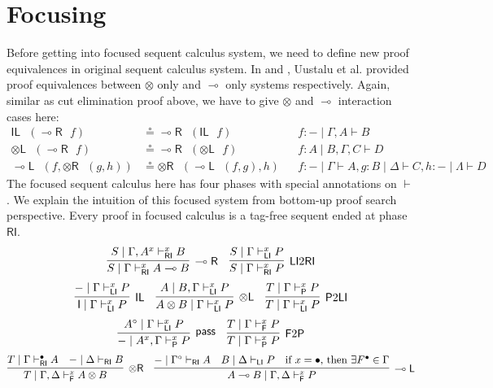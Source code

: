 \documentclass[submission,copyright,creativecommons]{eptcs}
\newcommand{\tl}{\otimes \mathsf{L}}
\newcommand{\tr}{\otimes \mathsf{R}}
\newcommand{\lright}{\multimap \mathsf{R}}
\newcommand{\lleft}{\multimap \mathsf{L}}
\newcommand{\pass}{\mathsf{pass}}
\newcommand{\unitl}{\mathsf{IL}}
\newcommand{\ot}{\otimes}
\newcommand{\lolli}{\multimap}
\newcommand{\I}{\mathsf{I}}
\newcommand{\RI}{\mathsf{RI}}
\newcommand{\LI}{\mathsf{LI}}
\newcommand{\Pass}{\mathsf{P}}
\newcommand{\F}{\mathsf{F}}
\newcommand{\xvdash}{\vdash^{x}}
\begin{document}
\section{Focusing}
Before getting into focused sequent calculus system, we need to define new proof equivalences in original sequent calculus system.
In \cite{uustalu:sequent:2018} and \cite{uustalu:deductive:nodate}, Uustalu et al. provided proof equivalences between $\ot$ only and $\lolli$ only systems respectively.
Again, similar as cut elimination proof above, we have to give $\ot$ and $\lolli$ interaction cases here:
\begin{align*}
  \unitl \text{ } (\lright \text{ } f) &\circeq \lright \text{ } (\unitl \text{ } f) &&f : - \mid \Gamma , A \vdash B
  \\
  \tl \text{ } (\lright \text{ } f) &\circeq \lright \text{ } (\tl \text{ } f) &&f : A \mid B , \Gamma , C \vdash D
  \\
  \lleft \text{ } (f, \tr \text{ } (g, h)) &\circeq \tr \text{ } (\lleft \text{ } (f , g), h) &&f: - \mid \Gamma \vdash A, g : B \mid \Delta \vdash C, h : - \mid \Lambda \vdash D
\end{align*}
The focused sequent calculus here has four phases with  special annotations on $\vdash$.
We explain the intuition of this focused system from bottom-up proof search perspective.
Every proof in focused calculus is a tag-free sequent ended at phase $\RI$.
\begin{displaymath}
  \infer[\lright]{S \mid \Gamma \vdash^{x}_{\RI} A \lolli B}{S \mid \Gamma , A^{x} \vdash^{x}_{\RI} B}
  \quad
  \infer[\LI 2 \RI]{S \mid \Gamma \vdash^{x}_{\RI} P}{S \mid \Gamma \vdash^{x}_{\LI} P}
\end{displaymath}
\begin{displaymath}
  \infer[\unitl]{\I \mid \Gamma \xvdash_{\LI} P}{- \mid \Gamma \xvdash_{\LI} P}
  \quad
  \infer[\tl]{A \ot B \mid \Gamma \xvdash_{\LI} P}{A \mid B , \Gamma \xvdash_{\LI} P}
  \quad
  \infer[\Pass 2 \LI]{T \mid \Gamma \xvdash_{\LI} P}{T \mid \Gamma \xvdash_{\Pass} P}
\end{displaymath}
\begin{displaymath}
  \infer[\pass]{- \mid A^{x} , \Gamma \xvdash_{\Pass} P }{A^{\circ} \mid \Gamma \xvdash_{\LI} P}
  \quad
  \infer[\F 2 \Pass]{T \mid \Gamma \xvdash_{\Pass} P}{T \mid \Gamma \xvdash_{\F} P}
\end{displaymath}
\begin{displaymath}
  \infer[\tr]{T \mid \Gamma , \Delta \xvdash_{\F} A \ot B}{
    T \mid \Gamma \vdash^{\bullet}_{\RI} A
    &
    - \mid \Delta \vdash_{\RI} B
  }
  \quad
  \infer[\lleft]{A \lolli B \mid \Gamma , \Delta \xvdash_{\F} P}{
    - \mid \Gamma^{\circ} \vdash_{\RI} A
    &
    B \mid \Delta \vdash_{\LI} P
    &
    \text{if } x = \bullet \text{, then } \exists F^{\bullet} \in \Gamma
  }
\end{displaymath}
\end{document}
